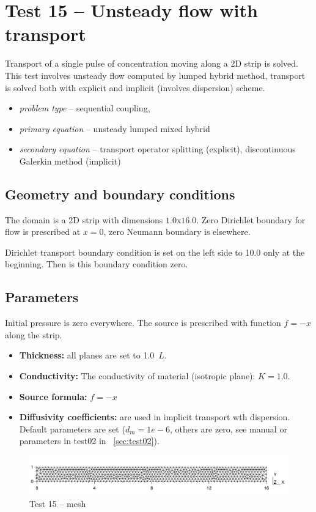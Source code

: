 \section{Test 15 -- Unsteady flow with transport}
Transport of a single pulse of concentration moving along a 2D strip is solved. This test involves unsteady flow computed by lumped hybrid method, transport is solved both with explicit and implicit (involves dispersion) scheme.
 
\begin{itemize} 
    \item \emph{problem type} -- sequential coupling, 
    \item \emph{primary equation} -- unsteady lumped mixed hybrid
    \item \emph{secondary equation} -- transport operator splitting (explicit), discontinuous Galerkin method (implicit)
  \end{itemize}

\subsection*{Geometry and boundary conditions}
The domain is a 2D strip with dimensions $1.0$x$16.0$. Zero Dirichlet boundary for flow is prescribed at $x=0$, zero Neumann boundary is elsewhere. 

Dirichlet transport boundary condition is set on the left side to 10.0 only at the beginning. Then is this boundary condition zero.

\subsection*{Parameters}
Initial pressure is zero everywhere. 
The source is prescribed with function $f=-x$ along the strip.
%
\begin{itemize}
  \item \textbf{Thickness:} all planes are set to 1.0~$L$.
  \item \textbf{Conductivity:} The conductivity of material (isotropic plane): $K=1.0$.
  \item \textbf{Source formula:} $f = -x$
  \item \textbf{Diffusivity coefficients:} are used in implicit transport wth dispersion. 
	Default parameters are set ($d_m=1e-6$, others are zero, see manual or parameters in test02 in ~\ref{sec:test02}).
\end{itemize}
%
\begin{figure}[htb!]
\centering
\includegraphics[width=15cm]{tests_graphics/15_mesh.pdf}
\caption{Test 15 -- mesh}
\label{fig:test13_mesh}
\end{figure}
%
%
